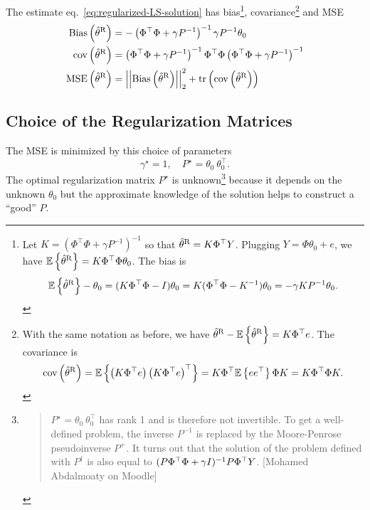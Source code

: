 The estimate eq.~\eqref{eq:regularized-LS-solution} has bias\footnote{Let $K = \left(\Phi^\top\Phi + \gamma P^{-1}\right)^{-1}$ so that $\hat{\theta}^\textrm{R} = K\Phi^\top Y$. Plugging $Y=\Phi\theta_0+e$, we have $\mathbb{E}\left\{\hat{\theta}^\textrm{R}\right\} = K\Phi^\top\Phi\theta_0$. The bias is
  \begin{equation*}
    \mathbb{E}\left\{\hat{\theta}^\textrm{R}\right\} - \theta_0 = (K\Phi^\top\Phi - I)\theta_0 = K(\Phi^\top\Phi - K^{-1})\theta_0 = -\gamma KP^{-1}\theta_0.
  \end{equation*}}, covariance\footnote{With the same notation as before, we have $\hat{\theta}^\textrm{R} - \mathbb{E}\left\{\hat{\theta}^\textrm{R}\right\} = K\Phi^\top e$. The covariance is
  \begin{equation*}
    \textrm{cov}\left(\hat{\theta}^\textrm{R}\right) = \mathbb{E}\left\{\left(K\Phi^\top e\right) \left(K\Phi^\top e\right)^\top\right\} = K\Phi^\top \mathbb{E}\left\{e e^\top\right\} \Phi K = K\Phi^\top\Phi K.
  \end{equation*}} and MSE
\begin{align*}
  \textrm{Bias}\left(\hat{\theta}^\textrm{R}\right) &= -\left(\Phi^\top\Phi + \gamma P^{-1}\right)^{-1}\gamma P^{-1}\theta_0 \\
  \textrm{cov}\left(\hat{\theta}^\textrm{R}\right) &= \left(\Phi^\top\Phi + \gamma P^{-1}\right)^{-1} \Phi^\top\Phi \left(\Phi^\top\Phi + \gamma P^{-1}\right)^{-1} \\
  \textrm{MSE}\left(\hat{\theta}^\textrm{R}\right) &= \left|\left|\textrm{Bias}\left(\hat{\theta}^\textrm{R}\right)\right|\right|_2^2 + \textrm{tr}\left(\textrm{cov}\left(\hat{\theta}^\textrm{R}\right)\right)
\end{align*}

\subsection{Choice of the Regularization Matrices}
\label{sec:regularization-matrices}

The MSE is minimized by this choice of parameters
\begin{equation}
  \label{eq:regLS-optimal-parameters}
  \gamma^\star = 1,\hspace{1em} P^\star = \theta_0^{\phantom{\top}} \theta_0^\top.
\end{equation}
The optimal regularization matrix $P^\star$ is unknown\footnote{\begin{quotation}
  $P^\star = \theta_0^{\phantom{\top}} \theta_0^\top$ has rank 1 and is therefore not invertible. To get a well-defined problem, the inverse $P^{-1}$ is replaced by the Moore-Penrose pseudoinverse $P^+$. It turns out that the solution of the problem defined with $P^\dagger$ is also equal to $(P\Phi^\top \Phi+\gamma I)^{-1}P\Phi^\top Y$. [Mohamed Abdalmoaty on Moodle]
\end{quotation}} because it depends on the unknown $\theta_0$ but the approximate knowledge of the solution helps to construct a ``good'' $P$.

